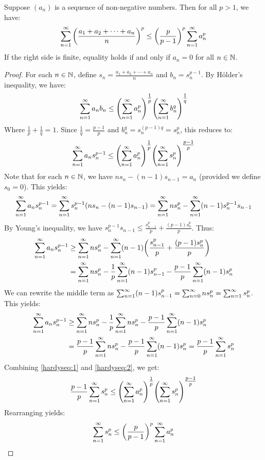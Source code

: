 \documentclass[main.tex]{subfiles}
\begin{document}
\begin{theorem}\label{hardyseq}
    Suppose $(a_n)$ is a sequence of non-negative numbers. Then for all $p>1$, we have:
    \begin{equation*}
        \sumn\qty(\frac{a_1+a_2+\cdots+a_n}{n})^p\le\qty(\frac{p}{p-1})^p\sumn a_n^p
    \end{equation*}
    If the right side is finite, equality holds if and only if $a_n=0$ for all $n\in\N$.
\end{theorem}
\begin{proof}
    For each $n\in\N$, define $s_n= \frac{a_1+a_2+\cdots+a_n}{n}$ and $b_n=s_n^{p-1}$. By Hölder's inequality, we have:
    \begin{equation*}
        \sumn a_nb_n\le\qty(\sumn a_n^p)^{\tfrac{1}{p}}\qty(\sumn b_n^q)^{\tfrac{1}{q}}
    \end{equation*}
    Where $\frac{1}{p}+\frac{1}{q}=1$. Since $\frac{1}{q}= \frac{p-1}{p}$ and $b_n^q=s_n^{(p-1)q}=s_n^p$, this reduces to:
    \begin{equation}\label{hardyseq:1}
        \sumn a_ns_n^{p-1}\le\qty(\sumn a_n^p)^{\tfrac{1}{p}}\qty(\sumn s_n^p)^{\tfrac{p-1}{p}}
    \end{equation}
    Note that for each $n\in\N$, we have $ns_n-(n-1)s_{n-1}=a_n$ (provided we define $s_0=0$). This yields:
    \begin{equation*}
        \sumn a_ns_n^{p-1}= \sumn s_n^{p-1}(ns_n-(n-1)s_{n-1})= \sumn ns_n^p-\sumn (n-1)s_n^{p-1}s_{n-1}
    \end{equation*}
    By Young's inequality, we have $s_n^{p-1}s_{n-1}\le\frac{s_{n-1}^p}{p}+\frac{(p-1)s_n^p}{p}$. Thus:
    \begin{align*}
        \sumn a_ns_n^{p-1}
        &\ge\sumn ns_n^p-\sumn (n-1)\qty(\frac{s_{n-1}^p}{p}+\frac{(p-1)s_n^p}{p}) \\
        &= \sumn ns_n^p-\frac{1}{p}\sumn (n-1)s_{n-1}^p-\frac{p-1}{p}\sumn (n-1)s_n^p
    \end{align*}
    We can rewrite the middle term as $\sumn (n-1)s_{n-1}^p= \sumn[0] ns_n^p= \sumn s_n^p$. This yields:
    \begin{align}\label{hardyseq:2}
        \sumn a_ns_n^{p-1}
        &\ge\sumn ns_n^p-\frac{1}{p}\sumn ns_n^p-\frac{p-1}{p}\sumn (n-1)s_n^p \nonumber\\
        &= \frac{p-1}{p}\sumn ns_n^p-\frac{p-1}{p}\sumn (n-1)s_n^p
        = \frac{p-1}{p}\sumn s_n^p
    \end{align}
    Combining \eqref{hardyseq:1} and \eqref{hardyseq:2}, we get:
    \begin{equation*}
        \frac{p-1}{p}\sumn s_n^p\le\qty(\sumn a_n^p)^{\tfrac{1}{p}}\qty(\sumn s_n^p)^{\tfrac{p-1}{p}}
    \end{equation*}
    Rearranging yields:
    \begin{equation*}
        \sumn s_n^p\le\qty(\frac{p}{p-1})^p\sumn a_n^p
    \end{equation*}
\end{proof}
\end{document}
